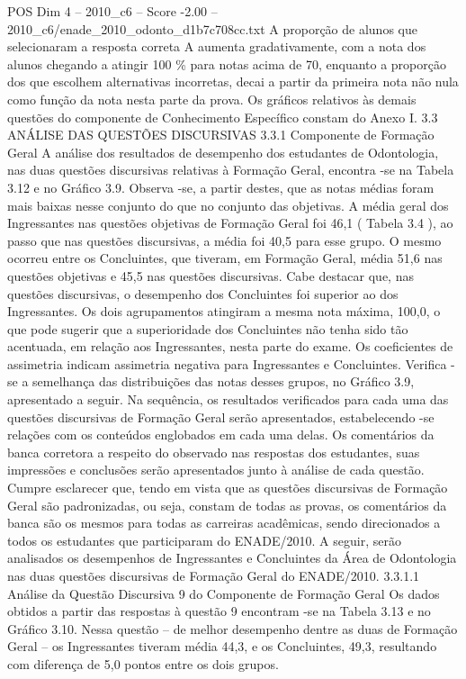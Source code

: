 \begin{textsample}{POS Dim 4 – 2010\_c6 – Score -2.00 – 2010\_c6/enade\_2010\_odonto\_d1b7c708cc.txt}
A proporção de alunos que selecionaram a resposta correta A aumenta gradativamente, com a nota dos alunos chegando a atingir 100 \% para notas acima de 70, enquanto a proporção dos que escolhem alternativas incorretas, decai a partir da primeira nota não nula como função da nota nesta parte da prova.
Os gráficos relativos às demais questões do componente de Conhecimento Específico constam do Anexo I. 3.3 ANÁLISE DAS QUESTÕES DISCURSIVAS 3.3.1 Componente de Formação Geral A análise dos resultados de desempenho dos estudantes de Odontologia, nas duas questões discursivas relativas à Formação Geral, encontra -se na Tabela 3.12 e no Gráfico 3.9.
Observa -se, a partir destes, que as notas médias foram mais baixas nesse conjunto do que no conjunto das objetivas.
A média geral dos Ingressantes nas questões objetivas de Formação Geral foi 46,1 ( Tabela 3.4 ), ao passo que nas questões discursivas, a média foi 40,5 para esse grupo.
O mesmo ocorreu entre os Concluintes, que tiveram, em Formação Geral, média 51,6 nas questões objetivas e 45,5 nas questões discursivas.
Cabe destacar que, nas questões discursivas, o desempenho dos Concluintes foi superior ao dos Ingressantes.
Os dois agrupamentos atingiram a mesma nota máxima, 100,0, o que pode sugerir que a superioridade dos Concluintes não tenha sido tão acentuada, em relação aos Ingressantes, nesta parte do exame.
Os coeficientes de assimetria indicam assimetria negativa para Ingressantes e Concluintes.
Verifica -se a semelhança das distribuições das notas desses grupos, no Gráfico 3.9, apresentado a seguir.
Na sequência, os resultados verificados para cada uma das questões discursivas de Formação Geral serão apresentados, estabelecendo -se relações com os conteúdos englobados em cada uma delas.
Os comentários da banca corretora a respeito do observado nas respostas dos estudantes, suas impressões e conclusões serão apresentados junto à análise de cada questão.
Cumpre esclarecer que, tendo em vista que as questões discursivas de Formação Geral são padronizadas, ou seja, constam de todas as provas, os comentários da banca são os mesmos para todas as carreiras acadêmicas, sendo direcionados a todos os estudantes que participaram do ENADE/2010.
A seguir, serão analisados os desempenhos de Ingressantes e Concluintes da Área de Odontologia nas duas questões discursivas de Formação Geral do ENADE/2010. 3.3.1.1 Análise da Questão Discursiva 9 do Componente de Formação Geral Os dados obtidos a partir das respostas à questão 9 encontram -se na Tabela 3.13 e no Gráfico 3.10.
Nessa questão – de melhor desempenho dentre as duas de Formação Geral – os Ingressantes tiveram média 44,3, e os Concluintes, 49,3, resultando com diferença de 5,0 pontos entre os dois grupos.

\end{textsample}
